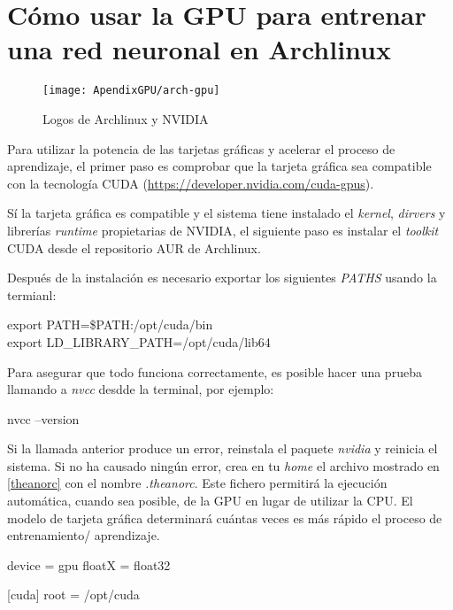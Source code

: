
\chapter{Cómo usar la GPU para entrenar una red neuronal en Archlinux} %
\label{app:gpu}

\begin{figure}[htp]
  \centering
    \texttt{[image: ApendixGPU/arch-gpu]}
  \caption{Logos de Archlinux y NVIDIA}
\label{fig:arch-gpu}
\end{figure}

Para utilizar la potencia de las tarjetas gráficas y acelerar el proceso de aprendizaje, el primer paso es comprobar
que la tarjeta gráfica sea compatible con la tecnología CUDA (\url{https://developer.nvidia.com/cuda-gpus}).

Sí la tarjeta gráfica es compatible y el sistema tiene instalado el \textit{kernel}, \textit{dirvers} y librerías
\textit{runtime} propietarias de NVIDIA, el siguiente paso es instalar el \textit{toolkit} CUDA desde el repositorio AUR de Archlinux.

Después de la instalación es necesario exportar los siguientes \textit{PATHS} usando la termianl:

\begin{center}
export PATH=\$PATH:/opt/cuda/bin \\
export LD\_LIBRARY\_PATH=/opt/cuda/lib64
\end{center}

Para asegurar que todo funciona correctamente, es posible hacer una prueba llamando a \textit{nvcc} desdde la terminal, por ejemplo:

\begin{center}
	nvcc --version
\end{center}

Si la llamada anterior produce un error, reinstala el paquete \textit{nvidia} y reinicia el sistema. Si no ha 
causado ningún error, crea en tu \textit{home} el archivo mostrado en \ref{theanorc} con el nombre 
\textit{.theanorc}. Este fichero permitirá la ejecución automática, cuando sea posible, de la GPU en lugar de
utilizar la CPU. El modelo de tarjeta gráfica determinará cuántas veces es más rápido el proceso de entrenamiento/
aprendizaje.


\begin{python}[frame=none, numbers=left, label={theanorc},  caption={Fichero .theanorc}]
[global]
device = gpu
floatX = float32

[cuda]
root = /opt/cuda
\end{python}


